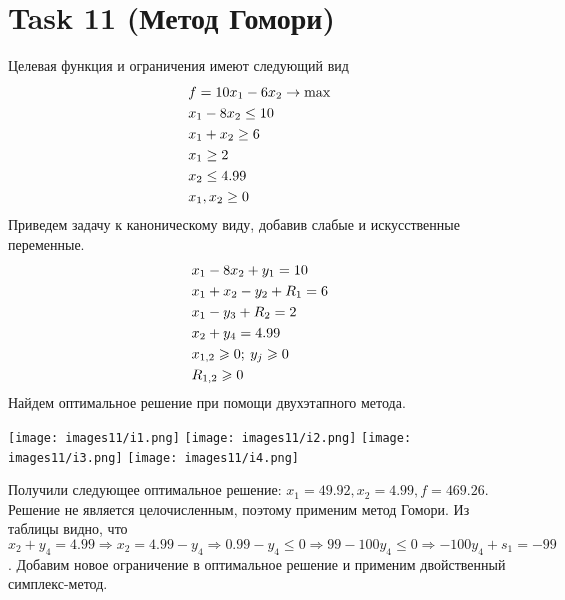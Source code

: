 \documentclass[12pt]{article}
\begin{document}
\section*{Task 11 (Метод Гомори)}
Целевая функция и ограничения имеют следующий вид
\begin{align}
  &f = 10x_1-6x_2\to\max\notag\\
  &x_1-8x_2\leq10\notag\\
  &x_1+x_2\geq6\\
  &x_1\geq2\notag\\
  &x_2\leq4.99\notag\\
  &x_1,x_2\geq0\notag
\end{align}
Приведем задачу к каноническому виду, добавив слабые и искусственные переменные.
\begin{align}
  &x_1-8x_2+y_1=10\notag\\
  &x_1+x_2-y_2+R_1=6\notag\\
  &x_1-y_3+R_2=2\notag\\
  &x_2+y_4=4.99\\
  &x_{1,2}\geqslant 0;\: y_j\geqslant 0\notag\\
  &R_{1,2}\geqslant 0\notag
\end{align}
Найдем оптимальное решение при помощи двухэтапного метода.\\
\begin{center}
\texttt{[image: images11/i1.png]}
\texttt{[image: images11/i2.png]}
\texttt{[image: images11/i3.png]}
\texttt{[image: images11/i4.png]}
\end{center}
Получили следующее оптимальное решение: $x_1=49.92, x_2=4.99, f= 469.26$. Решение не является целочисленным, поэтому
применим метод Гомори. Из таблицы видно, что $x_2+y_4=4.99\Rightarrow x_2=4.99-y_4\Rightarrow 0.99-y_4\leqslant 0
\Rightarrow 99-100y_4\leqslant 0\Rightarrow-100y_4+s_1=-99$. Добавим новое ограничение в оптимальное решение и применим двойственный симплекс-метод.
\end{document}
